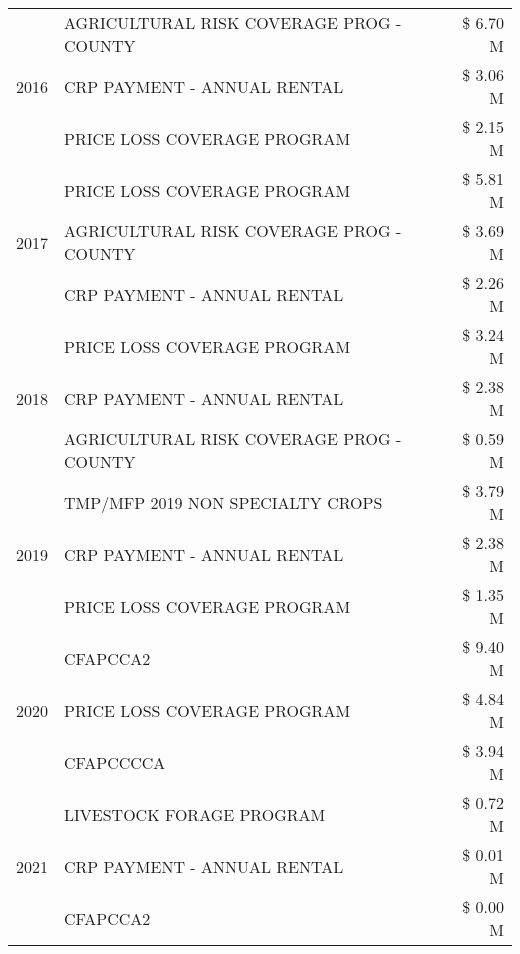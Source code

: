 \begin{tabular}{llr}
\cline{1-3}
\multirow[t]{3}{*}{2016} & AGRICULTURAL RISK COVERAGE PROG - COUNTY      & \$ 6.70 M \\
 & CRP PAYMENT - ANNUAL RENTAL                   & \$ 3.06 M \\
 & PRICE LOSS COVERAGE PROGRAM                   & \$ 2.15 M \\
\cline{1-3}
\multirow[t]{3}{*}{2017} & PRICE LOSS COVERAGE PROGRAM & \$ 5.81 M \\
 & AGRICULTURAL RISK COVERAGE PROG - COUNTY & \$ 3.69 M \\
 & CRP PAYMENT - ANNUAL RENTAL & \$ 2.26 M \\
\cline{1-3}
\multirow[t]{3}{*}{2018} & PRICE LOSS COVERAGE PROGRAM & \$ 3.24 M \\
 & CRP PAYMENT - ANNUAL RENTAL & \$ 2.38 M \\
 & AGRICULTURAL RISK COVERAGE PROG - COUNTY & \$ 0.59 M \\
\cline{1-3}
\multirow[t]{3}{*}{2019} & TMP/MFP 2019 NON SPECIALTY CROPS & \$ 3.79 M \\
 & CRP PAYMENT - ANNUAL RENTAL & \$ 2.38 M \\
 & PRICE LOSS COVERAGE PROGRAM & \$ 1.35 M \\
\cline{1-3}
\multirow[t]{3}{*}{2020} & CFAPCCA2 & \$ 9.40 M \\
 & PRICE LOSS COVERAGE PROGRAM & \$ 4.84 M \\
 & CFAPCCCCA & \$ 3.94 M \\
\cline{1-3}
\multirow[t]{3}{*}{2021} & LIVESTOCK FORAGE PROGRAM & \$ 0.72 M \\
 & CRP PAYMENT - ANNUAL RENTAL & \$ 0.01 M \\
 & CFAPCCA2 & \$ 0.00 M \\
\cline{1-3}
\bottomrule
\end{tabular}
